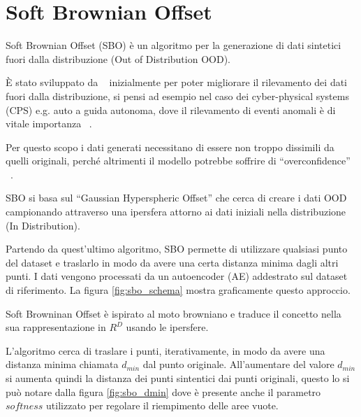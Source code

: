 \chapter{Soft Brownian Offset}

Soft Brownian Offset (SBO) è un algoritmo per la generazione di dati sintetici fuori dalla distribuzione (Out of Distribution OOD). 

È stato sviluppato da ~\cite{sbo} inizialmente per poter migliorare il rilevamento dei dati fuori dalla distribuzione, si pensi ad esempio nel caso dei cyber-physical systems (CPS) e.g. auto a guida autonoma, dove il rilevamento di eventi anomali è di vitale importanza ~\cite{yuhasEmbeddedOutofdistributionDetection2021}.

Per questo scopo i dati generati necessitano di essere non troppo dissimili da quelli originali, perché altrimenti il modello potrebbe soffrire di ``overconfidence'' ~\cite{amodeiConcreteProblemsAI2016}.

SBO si basa sul ``Gaussian Hyperspheric Offset'' che cerca di creare i dati OOD campionando attraverso una ipersfera attorno ai dati iniziali nella distribuzione (In Distribution).

Partendo da quest'ultimo algoritmo, SBO permette di utilizzare qualsiasi punto del dataset e traslarlo in modo da avere una certa distanza minima dagli altri punti. I dati vengono processati da un autoencoder (AE) addestrato sul dataset di riferimento. La figura \ref{fig:sbo_schema} mostra graficamente questo approccio. 

Soft Browninan Offset è ispirato al moto browniano e traduce il concetto nella sua rappresentazione in $R^D$ usando le ipersfere.

L'algoritmo cerca di traslare i punti, iterativamente, in modo da avere una distanza minima chiamata $d_{min}$ dal punto originale. All'aumentare del valore $d_{min}$ si aumenta quindi la distanza dei punti sintentici dai punti originali, questo lo si può notare dalla figura \ref{fig:sbo_dmin} dove è presente anche il parametro $softness$ utilizzato per regolare il riempimento delle aree vuote.


